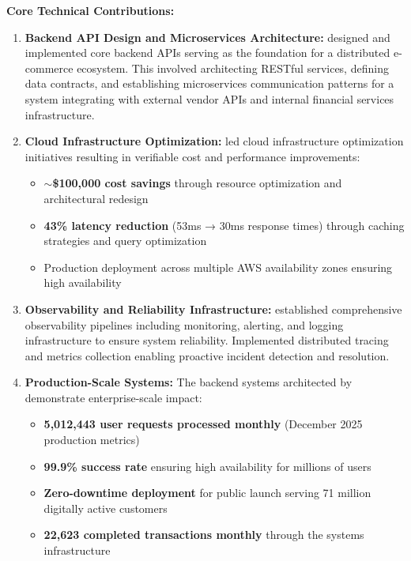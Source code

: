 \textbf{Core Technical Contributions:}

\begin{enumerate}
    \item \textbf{Backend API Design and Microservices Architecture:} \dr designed and implemented core backend APIs serving as the foundation for a distributed e-commerce ecosystem. This involved architecting RESTful services, defining data contracts, and establishing microservices communication patterns for a system integrating with external vendor APIs and internal financial services infrastructure.
    
    \item \textbf{Cloud Infrastructure Optimization:} \dr led cloud infrastructure optimization initiatives resulting in verifiable cost and performance improvements:
    \begin{itemize}
        \item \textbf{$\sim$\$100,000 cost savings} through resource optimization and architectural redesign
        \item \textbf{43\% latency reduction} (53ms → 30ms response times) through caching strategies and query optimization
        \item Production deployment across multiple AWS availability zones ensuring high availability
    \end{itemize}
    
    \item \textbf{Observability and Reliability Infrastructure:} \dr established comprehensive observability pipelines including monitoring, alerting, and logging infrastructure to ensure system reliability. Implemented distributed tracing and metrics collection enabling proactive incident detection and resolution.
    
    \item \textbf{Production-Scale Systems:} The backend systems architected by \dr demonstrate enterprise-scale impact:
    \begin{itemize}
        \item \textbf{5,012,443 user requests processed monthly} (December 2025 production metrics)
        \item \textbf{99.9\% success rate} ensuring high availability for millions of users
        \item \textbf{Zero-downtime deployment} for public launch serving 71 million digitally active customers
        \item \textbf{22,623 completed transactions monthly} through the systems infrastructure
    \end{itemize}
\end{enumerate}

